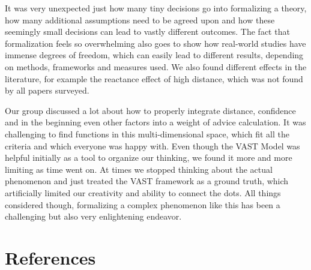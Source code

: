 \documentclass[
  man,floatsintext]{apa6}
\begin{document}
It was very unexpected just how many tiny decisions go into formalizing a theory, how many additional assumptions need to be agreed upon and how these seemingly small decisions can lead to vastly different outcomes. The fact that formalization feels so overwhelming also goes to show how real-world studies have immense degrees of freedom, which can easily lead to different results, depending on methods, frameworks and measures used. We also found different effects in the literature, for example the reactance effect of high distance, which was not found by all papers surveyed.

Our group discussed a lot about how to properly integrate distance, confidence and in the beginning even other factors into a weight of advice calculation. It was challenging to find functions in this multi-dimensional space, which fit all the criteria and which everyone was happy with. Even though the VAST Model was helpful initially as a tool to organize our thinking, we found it more and more limiting as time went on. At times we stopped thinking about the actual phenomenon and just treated the VAST framework as a ground truth, which artificially limited our creativity and ability to connect the dots. All things considered though, formalizing a complex phenomenon like this has been a challenging but also very enlightening endeavor.

\newpage

\hypertarget{references}{%
\section{References}\label{references}}
\end{document}
